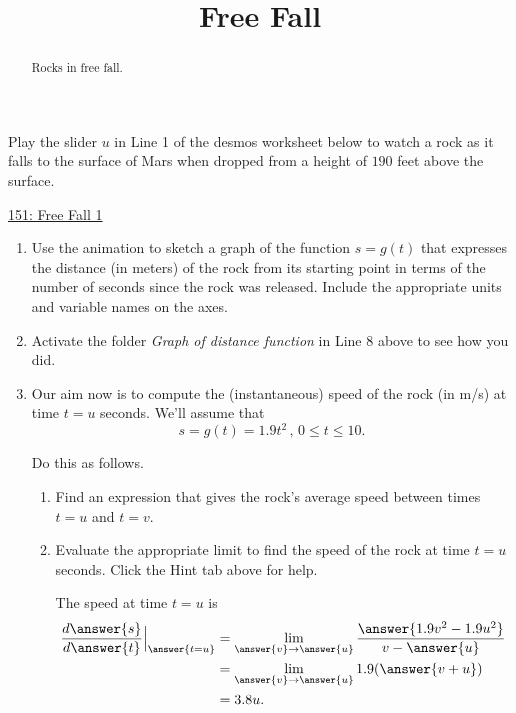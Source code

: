 \documentclass{ximera}
\title{Free Fall}
\begin{document}
\begin{abstract}
Rocks in free fall.
\end{abstract}
\maketitle



\begin{exploration}  \label{Qvbbtrg43444}

Play the slider $u$ in Line 1 of the desmos worksheet below to watch a rock as it falls to the surface of Mars when dropped from a height of $190$ feet above the surface.

\begin{onlineOnly}
    \begin{center}
\end{center}
\end{onlineOnly}

\href{https://www.desmos.com/calculator/gwhbaag99o}{151: Free Fall 1}

\begin{enumerate}
\item Use the animation to sketch a graph of the function $s=g(t)$ that expresses the distance (in meters) of the rock from its starting point in terms of the number of seconds since the rock was released. Include the appropriate units and variable names on the axes.

\item Activate the folder \emph{Graph of distance function} in Line 8 above to see how you did.

\item Our aim now is to compute the (instantaneous) speed of the rock (in m/s) at time $t=u$ seconds. We'll assume that 
\[
      s = g(t) = 1.9t^2 \, , \, 0\leq t \leq 10.
\] 

Do this as follows.  

\begin{enumerate}
\item Find an expression that gives the rock's average speed between times $t=u$ and $t=v$.

\item Evaluate the appropriate limit to find the speed of the rock at time $t=u$ seconds. Click the Hint tab above for help.

\begin{hint}

The speed at time $t=u$ is
\begin{align*}
    \frac{d\answer{s}}{d\answer{t}} \Big|_{\answer{t=u}} &=      \lim_{\answer{v}\to \answer{u}} \frac{\answer{1.9v^2-1.9u^2}}{v-\answer{u}}   \\
                                                       & = \lim_{\answer{v}\to \answer{u}} 1.9(\answer{v+u}) \\
                                                       & = 3.8u .
 \end{align*}
\end{hint}


\end{enumerate}
\end{enumerate}
\end{exploration}
\end{document}
